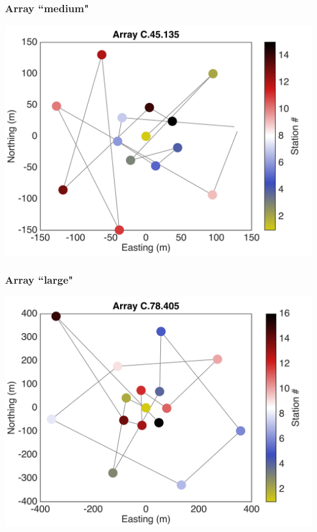 \documentclass{beamer}
\begin{document}
\frame
{
\frametitle{{\bf Array ``medium"}}
\centering
\includegraphics[width=\textwidth]{../pics/C-45-135/array.png}
}
\frame
{
\frametitle{{\bf Array ``large"}}
\centering
\includegraphics[width=\textwidth]{../pics/C-78-405/array.png}
}
\end{document}
